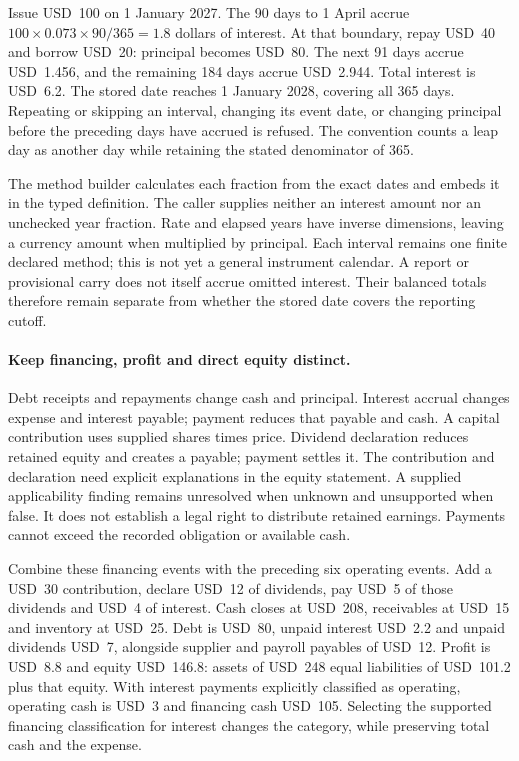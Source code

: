 Issue USD~100 on 1 January 2027. The 90 days to 1 April accrue
$100\times0.073\times90/365=1.8$ dollars of interest. At that boundary, repay
USD~40 and borrow USD~20: principal becomes USD~80. The next 91 days accrue
USD~1.456, and the remaining 184 days accrue USD~2.944. Total interest is USD~6.2.
The stored date reaches 1 January 2028, covering all 365 days. Repeating or skipping
an interval, changing its event date, or changing principal before the preceding
days have accrued is refused. The convention counts a leap day as another day
while retaining the stated denominator of 365.

The method builder calculates each fraction from the exact dates and embeds it
in the typed definition. The caller supplies neither an interest amount nor an
unchecked year fraction. Rate and elapsed years have inverse dimensions, leaving
a currency amount when multiplied by principal. Each interval remains one finite
declared method; this is not yet a general instrument calendar. A report or
provisional carry does not itself accrue omitted interest. Their balanced totals
therefore remain separate from whether the stored date covers the reporting cutoff.

\paragraph{Keep financing, profit and direct equity distinct.}
Debt receipts and repayments change cash and principal. Interest accrual changes
expense and interest payable; payment reduces that payable and cash. A capital
contribution uses supplied shares times price. Dividend declaration reduces
retained equity and creates a payable; payment settles it. The contribution and
declaration need explicit explanations in the equity statement. A supplied
applicability finding remains unresolved when unknown and unsupported when false.
It does not establish a legal right to distribute retained earnings. Payments
cannot exceed the recorded obligation or available cash.

Combine these financing events with the preceding six operating events. Add a
USD~30 contribution, declare USD~12 of dividends, pay USD~5 of those dividends
and USD~4 of interest. Cash closes at USD~208, receivables at USD~15 and inventory
at USD~25. Debt is USD~80, unpaid interest USD~2.2 and unpaid dividends USD~7,
alongside supplier and payroll payables of USD~12. Profit is USD~8.8 and equity
USD~146.8: assets of USD~248 equal liabilities of USD~101.2 plus that equity.
With interest payments explicitly classified as operating, operating cash is
USD~3 and financing cash USD~105. Selecting the supported financing classification
for interest changes the category, while preserving total cash and the expense.

